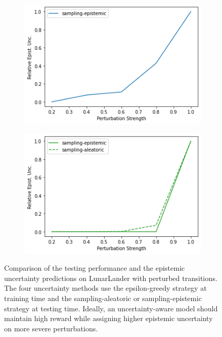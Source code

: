 \begin{figure}
\begin{subfigure}{.245\textwidth}
        \includegraphics[width=\textwidth]{sections/011_icml2022/resources/transition_shift-DKL-LunarLanderShift-v0-mean_epistemic_uncertainty_.png}
    \end{subfigure}
    \begin{subfigure}{.245\textwidth}
        \includegraphics[width=\textwidth]{sections/011_icml2022/resources/transition_shift-PostNet-LunarLanderShift-v0-mean_epistemic_uncertainty_.png}
    \end{subfigure}
        \vspace{-2mm}
    \caption{Comparison of the testing performance and the epistemic uncertainty predictions on LunarLander with perturbed transitions. The four uncertainty methods use the epsilon-greedy strategy at training time and the sampling-aleatoric or sampling-epistemic strategy at testing time. Ideally, an uncertainty-aware model should maintain high reward while assigning higher epistemic uncertainty on more severe perturbations.}
    \label{fig:strategy-transition-shift-testing-performance-lunarlander}
        \vspace{-3mm}
\end{figure}